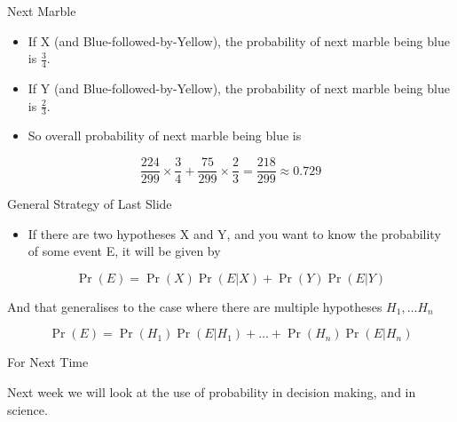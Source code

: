 \documentclass[
  ignorenonframetext,
]{beamer}
\providecommand{\tightlist}{%
  \setlength{\itemsep}{0pt}\setlength{\parskip}{0pt}}
\renewcommand{\,}{\text{, }}
\begin{document}
\begin{frame}{Next Marble}
\protect\hypertarget{next-marble}{}

\begin{itemize}
\tightlist
\item
  If X (and Blue-followed-by-Yellow), the probability of next marble
  being blue is \(\frac{3}{4}\).
\item
  If Y (and Blue-followed-by-Yellow), the probability of next marble
  being blue is \(\frac{2}{3}\). \pause
\item
  So overall probability of next marble being blue is
\end{itemize}

\[
 \frac{224}{299} \times \frac{3}{4} + \frac{75}{299} \times \frac{2}{3} = \frac{218}{299} \approx 0.729
\]

\end{frame}

\begin{frame}{General Strategy of Last Slide}
\protect\hypertarget{general-strategy-of-last-slide}{}

\begin{itemize}
\tightlist
\item
  If there are two hypotheses X and Y, and you want to know the
  probability of some event E, it will be given by
\end{itemize}

\[
\Pr(E) = \Pr(X)\Pr(E | X) + \Pr(Y)\Pr(E | Y)
\]

And that generalises to the case where there are multiple hypotheses
\(H_1, \dots H_n\)

\[
\Pr(E) = \Pr(H_1)\Pr(E | H_1) + \dots +  \Pr(H_n)\Pr(E | H_n)
\]

\end{frame}

\begin{frame}{For Next Time}
\protect\hypertarget{for-next-time}{}

Next week we will look at the use of probability in decision making, and
in science.

\end{frame}
\end{document}
